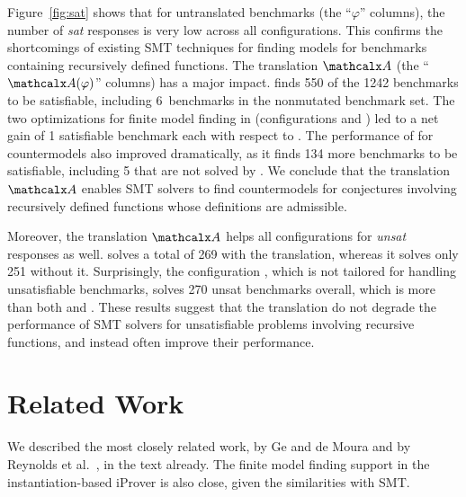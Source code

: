 Figure~\ref{fig:sat} shows that for untranslated benchmarks (the ``$\varphi$''
columns), the number of \emph{sat} responses is very low across all
configurations. This confirms the shortcomings of existing SMT techniques for
finding models for benchmarks containing recursively defined functions.
%
The translation $\conv$ (the ``$\conv(\varphi)$'' columns) has a major
impact. \cvcf finds 550 of the 1242 benchmarks to be satisfiable,
including 6~benchmarks in the nonmutated \leon benchmark set. 
The two optimizations for finite model finding in \cvc (configurations \cvcfe and \cvcfm) 
led to a net gain of 1 satisfiable benchmark each with respect to \cvcf.
The performance of \ziiib for countermodels also improved dramatically, as it
finds 134 more benchmarks to be satisfiable, including 5 that are not solved by \cvcf.
%
We conclude that the translation $\conv$ enables SMT
solvers to find countermodels for conjectures involving recursively defined functions
whose definitions are admissible.

Moreover,
the translation $\conv$ helps all configurations for \emph{unsat} responses as well.
\ziii solves a total of 269 with the translation, whereas it solves only 251 without it.
Surprisingly,
the configuration \cvcf, which is not tailored for handling unsatisfiable benchmarks,
solves 270 unsat benchmarks overall, which is more than both \cvcd and \ziii.
These results suggest that the translation do not degrade the performance 
of SMT solvers for unsatisfiable problems involving recursive functions, 
and instead often improve their performance.

\section{Related Work}

We described the most closely related work, by Ge and de Moura
\cite{GeDeM-CAV-09} and by Reynolds et al.\
\cite{ReyEtAl-1-RR-13,reynolds-et-al-2013}, in the text already.
The finite model finding support in the instantiation-based iProver
\cite{korovin-2013} is also close, given the similarities with SMT.



